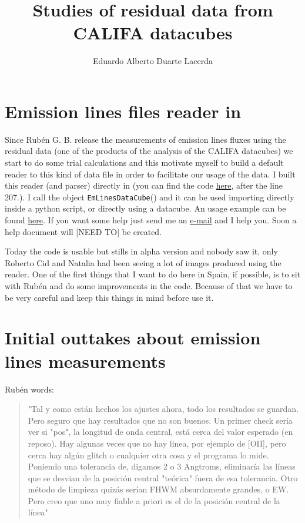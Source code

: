 \documentclass[a4paper,11pt]{article}
\begin{document}
\title{Studies of residual data from CALIFA datacubes}
\author{Eduardo Alberto Duarte Lacerda}

\section{Emission lines files reader in \pycasso}

Since Rubén G. B. release the measurements of emission lines fluxes using the residual data (one of the products of the \starlight analysis of the CALIFA datacubes) we start to do some trial calculations and this motivate myself to build a default reader to this kind of data file in order to facilitate our usage of the data. I built this reader (and parser) directly in \pycasso (you can find the code \href{https://bitbucket.org/astro_ufsc/pycasso/src/e1df479c41c23f86687ea4da417f43dd86956722/src/pycasso/fitsdatacube.py?at=default}{here},  after the line 207.). I call the object \texttt{EmLinesDataCube}() and it can be used importing directly inside a python script, or directly using a \pycasso datacube. An usage example can be found \href{https://bitbucket.org/astro_ufsc/pycasso/src/e1df479c41c23f86687ea4da417f43dd86956722/contrib/emLinesExample.py?at=default}{here}. If you want some help just send me an \href{mailto:lacerda@iaa.es}{e-mail} and I help you. Soon a help document will [NEED TO] be created.

Today the code is usable but stills in alpha version and nobody saw it, only Roberto Cid and Natalia had been seeing a lot of images produced using the reader. One of the first things that I want to do here in Spain, if possible, is to sit with Rub\'en and do some improvements in the code. Because of that we have to be very careful and keep this things in mind before use it.

\section{Initial outtakes about emission lines measurements}

Rub\'en words:

\begin{quotation}
"Tal y como están hechos los ajustes ahora, todo los resultados se guardan. Pero seguro que hay resultados que no son buenos. Un primer check sería ver si "pos", la longitud de onda central, está cerca del valor esperado (en reposo). Hay algunas veces que no hay linea, por ejemplo de [OII], pero cerca hay algún glitch o cualquier otra cosa y el programa lo mide. Poniendo una tolerancia de, digamos 2 o 3 Angtroms, eliminaría las líneas que se desvian de la posición central "teórica" fuera de esa tolerancia. Otro método de limpieza quizás serían FHWM absurdamente grandes, o EW. Pero creo que uno muy fiable a priori es el de la posición central de la línea"
\end{quotation}
\end{document}
